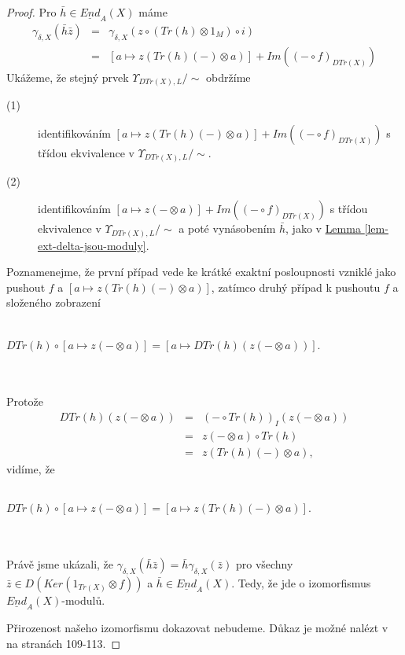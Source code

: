 \begin{proof}
          
          Pro $\bar h \in \underline{End}_A(X)$ máme
          \begin{eqnarray}
            \gamma_{\delta, X}(\bar h \bar z)&=& \gamma_{\delta, X}(z\circ (Tr(h)\otimes 1_M)\circ i) \nonumber \\
            &=& [a\mapsto z(Tr(h)(-)\otimes a)]+Im((-\circ f)_{DTr(X)}) \nonumber
          \end{eqnarray}      
         Ukážeme, že stejný prvek $\Upsilon_{DTr(X),L}/\sim$ obdržíme
         \begin{description}
           \item[(1)] identifikováním $[a\mapsto z(Tr(h)(-)\otimes a)]+Im((-\circ f)_{DTr(X)}) 
           $
           s třídou ekvivalence v $\Upsilon_{DTr(X),L}/\sim$.
           \item[(2)] identifikováním $[a\mapsto z(-\otimes a)]+Im((-\circ f)_{DTr(X)})$ 
            s třídou ekvivalence v $\Upsilon_{DTr(X),L}/\sim$ a poté 
            vynásobením $\bar h$, jako v  \hyperref[lem-ext-delta-jsou-moduly]{Lemma \ref*{lem-ext-delta-jsou-moduly}}.
         \end{description}
         
         Poznamenejme, že první případ vede ke krátké exaktní posloupnosti 
         vzniklé jako pushout $f$ a $[a\mapsto z(Tr(h)(-)\otimes a)]$, zatímco 
         druhý případ k pushoutu $f$ a složeného zobrazení \\\\
         \centerline{$DTr(h)\circ[a\mapsto z(-\otimes a)]=[a\mapsto DTr(h)(z(-\otimes a))]$.}\\\\
         Protože
         \begin{eqnarray}
           DTr(h)(z(-\otimes a)) &=& (-\circ Tr(h))_I(z(-\otimes a)) \nonumber 
           \\
           &=& z(-\otimes a)\circ Tr(h) \nonumber \\
           &=& z(Tr(h)(-)\otimes a), \nonumber 
         \end{eqnarray}
         vidíme, že \\\\
         \centerline{$
         DTr(h)\circ [a\mapsto z(-\otimes a)]=[a\mapsto z(Tr(h)(-)\otimes a)].
         $}\\\\
         Právě jsme ukázali, že $\gamma_{\delta, X}(\bar h\bar z)=\bar h \gamma_{\delta, X}(\bar z)$ 
         pro všechny $\bar z\in D(Ker(1_{Tr(X)}\otimes f))$ a $\bar h\in 
         \underline{End}_A(X)$. Tedy, že jde o izomorfismus 
         $\underline{End}_A(X)$-modulů.
         
         
          Přirozenost našeho izomorfismu dokazovat nebudeme. Důkaz je možné 
          nalézt v \cite{3} na stranách 109-113.
        \end{proof}
        

